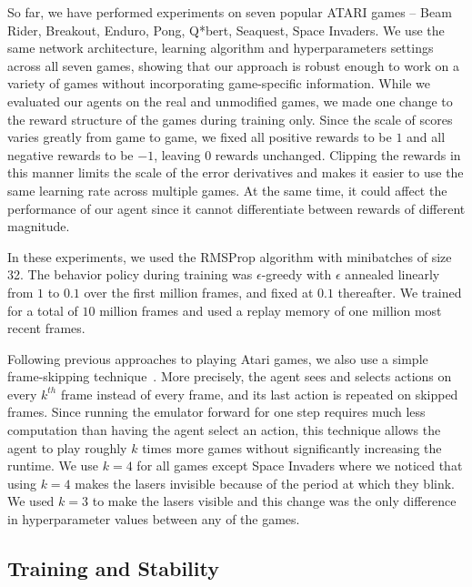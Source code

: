 
So far, we have performed experiments on seven popular ATARI games -- Beam Rider, Breakout, Enduro, Pong, Q*bert, Seaquest, Space Invaders. We use the same network architecture, learning algorithm and hyperparameters settings across all seven games, showing that our approach is robust enough to work on a variety of games without incorporating game-specific information. While we evaluated our agents on the real and unmodified games, we made one change to the reward structure of the games during training only.  Since the scale of scores varies greatly from game to game, we fixed all positive rewards to be $1$ and all negative rewards to be $-1$, leaving $0$ rewards unchanged.  Clipping the rewards in this manner limits the scale of the error derivatives and makes it easier to use the same learning rate across multiple games.  At the same time, it could affect the performance of our agent since it cannot differentiate between rewards of different magnitude.

In these experiments, we used the RMSProp algorithm with minibatches of size 32.  The behavior policy during training was $\epsilon$-greedy with $\epsilon$ annealed linearly from $1$ to $0.1$ over the first million frames, and fixed at $0.1$ thereafter.  We trained for a total of $10$ million frames and used a replay memory of one million most recent frames.

Following previous approaches to playing Atari games, we also use a simple frame-skipping technique~\cite{bellemare-ale}. More precisely, the agent sees and selects actions on every $k^{th}$ frame instead of every frame, and its last action is repeated on skipped frames.  Since running the emulator forward for one step requires much less computation than having the agent select an action, this technique allows the agent to play roughly $k$ times more games without significantly increasing the runtime.  We use $k=4$ for all games except Space Invaders where we noticed that using $k=4$ makes the lasers invisible because of the period at which they blink.  We used $k=3$ to make the lasers visible and this change was the only difference in hyperparameter values between any of the games.

\subsection{Training and Stability}

